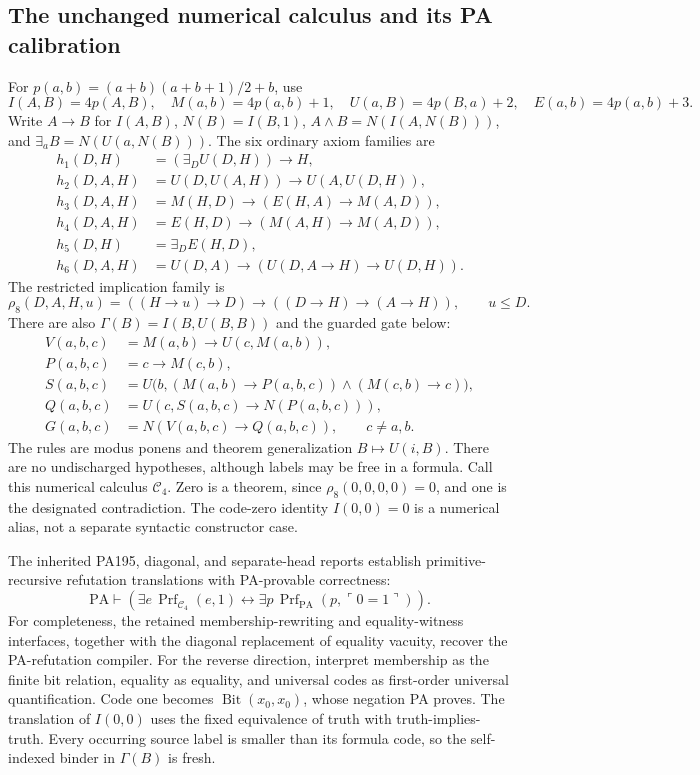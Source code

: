\subsection{The unchanged numerical calculus and its PA calibration}

For $p(a,b)=(a+b)(a+b+1)/2+b$, use
\[
 I(A,B)=4p(A,B),\quad M(a,b)=4p(a,b)+1,\quad
 U(a,B)=4p(B,a)+2,\quad E(a,b)=4p(a,b)+3.
\]
Write $A\to B$ for $I(A,B)$, $N(B)=I(B,1)$,
$A\wedge B=N(I(A,N(B)))$, and $\exists_a B=N(U(a,N(B)))$.
The six ordinary axiom families are
\begin{align*}
 h_1(D,H)&=(\exists_D U(D,H))\to H,\\
 h_2(D,A,H)&=U(D,U(A,H))\to U(A,U(D,H)),\\
 h_3(D,A,H)&=M(H,D)\to(E(H,A)\to M(A,D)),\\
 h_4(D,A,H)&=E(H,D)\to(M(A,H)\to M(A,D)),\\
 h_5(D,H)&=\exists_D E(H,D),\\
 h_6(D,A,H)&=U(D,A)\to(U(D,A\to H)\to U(D,H)).
\end{align*}
The restricted implication family is
\[
 \rho_8(D,A,H,u)=((H\to u)\to D)\to((D\to H)\to(A\to H)),
 \qquad u\leq D.
\]
There are also $\Gamma(B)=I(B,U(B,B))$ and the guarded gate below:
\begin{align*}
 V(a,b,c)&=M(a,b)\to U(c,M(a,b)),\\
 P(a,b,c)&=c\to M(c,b),\\
 S(a,b,c)&=U\bigl(b,(M(a,b)\to P(a,b,c))
                              \wedge(M(c,b)\to c)\bigr),\\
 Q(a,b,c)&=U(c,S(a,b,c)\to N(P(a,b,c))),\\
 G(a,b,c)&=N(V(a,b,c)\to Q(a,b,c)),\qquad c\ne a,b.
\end{align*}
The rules are modus ponens and theorem generalization $B\mapsto U(i,B)$.
There are no undischarged hypotheses, although labels may be free in a
formula. Call this numerical calculus $\mathcal C_4$. Zero is a theorem,
since $\rho_8(0,0,0,0)=0$, and one is the designated contradiction.
The code-zero identity $I(0,0)=0$ is a numerical alias, not a separate
syntactic constructor case.

The inherited PA195, diagonal, and separate-head reports establish
primitive-recursive refutation translations with PA-provable correctness:
\[
 \mathrm{PA}\vdash
 \left(\exists e\,\operatorname{Prf}_{\mathcal C_4}(e,1)
 \leftrightarrow
 \exists p\,\operatorname{Prf}_{\mathrm{PA}}
                         (p,\ulcorner0=1\urcorner)\right). \tag{C}
\]
For completeness, the retained membership-rewriting and equality-witness
interfaces, together with the diagonal replacement of equality vacuity,
recover the PA-refutation compiler. For the reverse direction, interpret
membership as the finite bit relation, equality as equality, and universal
codes as first-order universal quantification. Code one becomes
$\operatorname{Bit}(x_0,x_0)$, whose negation PA proves. The translation
of $I(0,0)$ uses the fixed equivalence of truth with truth-implies-truth.
Every occurring source label is smaller than its formula code, so the
self-indexed binder in $\Gamma(B)$ is fresh.

